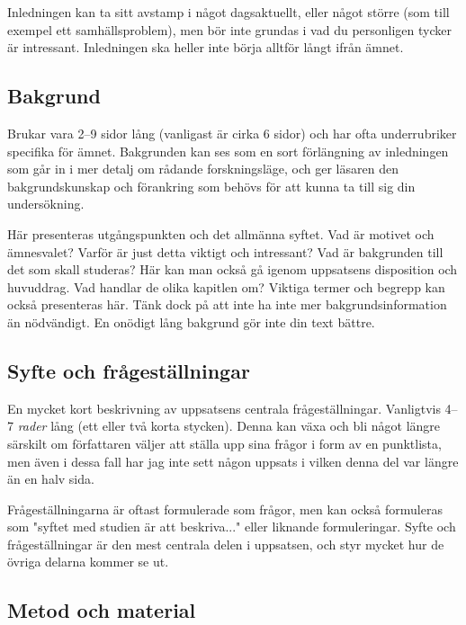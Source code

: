 Inledningen kan ta sitt avstamp i något dagsaktuellt, eller något större (som
till exempel ett samhällsproblem), men bör inte grundas i vad du personligen
tycker är intressant. Inledningen ska heller inte börja alltför långt ifrån
ämnet.


\subsection{Bakgrund}
\label{rubrik.bakgrund}

Brukar vara 2--9 sidor lång (vanligast är cirka 6 sidor) och har ofta
underrubriker specifika för ämnet. Bakgrunden kan ses som en sort förlängning
av inledningen som går in i mer detalj om rådande forskningsläge, och ger
läsaren den bakgrundskunskap och förankring som behövs för att kunna ta till
sig din undersökning.

Här presenteras utgångspunkten och det allmänna syftet. Vad är motivet och
ämnesvalet? Varför är just detta viktigt och intressant? Vad är bakgrunden till
det som skall studeras? Här kan man också gå igenom uppsatsens disposition och
huvuddrag. Vad handlar de olika kapitlen om? Viktiga termer och begrepp kan
också presenteras här. Tänk dock på att inte ha inte mer bakgrundsinformation
än nödvändigt. En onödigt lång bakgrund gör inte din text bättre.


\subsection{Syfte och frågeställningar}
\label{rubrik.syfte}

En mycket kort beskrivning av uppsatsens centrala frågeställningar. Vanligtvis
4–7 \emph{rader} lång (ett eller två korta stycken). Denna kan växa och bli
något längre särskilt om författaren väljer att ställa upp sina frågor i form
av en punktlista, men även i dessa fall har jag inte sett någon uppsats i
vilken denna del var längre än en halv sida.

Frågeställningarna är oftast formulerade som frågor, men kan också formuleras
som "syftet med studien är att beskriva..." eller liknande formuleringar. Syfte
och frågeställningar är den mest centrala delen i uppsatsen, och styr mycket
hur de övriga delarna kommer se ut.


\subsection{Metod och material}
\label{rubrik.metod}

